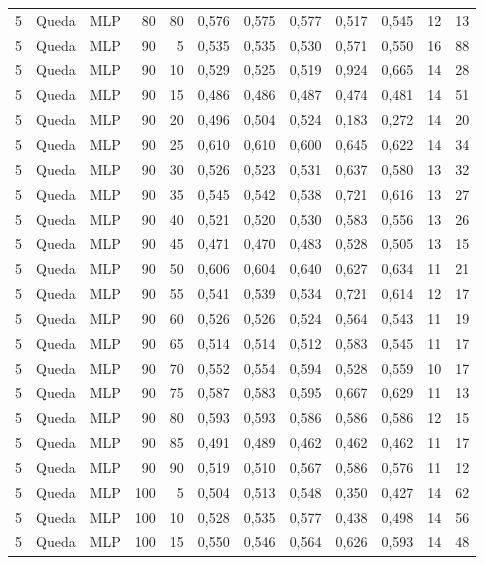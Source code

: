 \begin{longtable}{@{}rllrrrrrrrrr@{}}
5 & Queda & MLP & 80 & 80 & 0,576 & 0,575 & 0,577 & 0,517 & 0,545 & 12 & 13 \\
5 & Queda & MLP & 90 & 5 & 0,535 & 0,535 & 0,530 & 0,571 & 0,550 & 16 & 88 \\
5 & Queda & MLP & 90 & 10 & 0,529 & 0,525 & 0,519 & 0,924 & 0,665 & 14 & 28 \\
5 & Queda & MLP & 90 & 15 & 0,486 & 0,486 & 0,487 & 0,474 & 0,481 & 14 & 51 \\
5 & Queda & MLP & 90 & 20 & 0,496 & 0,504 & 0,524 & 0,183 & 0,272 & 14 & 20 \\
5 & Queda & MLP & 90 & 25 & 0,610 & 0,610 & 0,600 & 0,645 & 0,622 & 14 & 34 \\
5 & Queda & MLP & 90 & 30 & 0,526 & 0,523 & 0,531 & 0,637 & 0,580 & 13 & 32 \\
5 & Queda & MLP & 90 & 35 & 0,545 & 0,542 & 0,538 & 0,721 & 0,616 & 13 & 27 \\
5 & Queda & MLP & 90 & 40 & 0,521 & 0,520 & 0,530 & 0,583 & 0,556 & 13 & 26 \\
5 & Queda & MLP & 90 & 45 & 0,471 & 0,470 & 0,483 & 0,528 & 0,505 & 13 & 15 \\
5 & Queda & MLP & 90 & 50 & 0,606 & 0,604 & 0,640 & 0,627 & 0,634 & 11 & 21 \\
5 & Queda & MLP & 90 & 55 & 0,541 & 0,539 & 0,534 & 0,721 & 0,614 & 12 & 17 \\
5 & Queda & MLP & 90 & 60 & 0,526 & 0,526 & 0,524 & 0,564 & 0,543 & 11 & 19 \\
5 & Queda & MLP & 90 & 65 & 0,514 & 0,514 & 0,512 & 0,583 & 0,545 & 11 & 17 \\
5 & Queda & MLP & 90 & 70 & 0,552 & 0,554 & 0,594 & 0,528 & 0,559 & 10 & 17 \\
5 & Queda & MLP & 90 & 75 & 0,587 & 0,583 & 0,595 & 0,667 & 0,629 & 11 & 13 \\
5 & Queda & MLP & 90 & 80 & 0,593 & 0,593 & 0,586 & 0,586 & 0,586 & 12 & 15 \\
5 & Queda & MLP & 90 & 85 & 0,491 & 0,489 & 0,462 & 0,462 & 0,462 & 11 & 17 \\
5 & Queda & MLP & 90 & 90 & 0,519 & 0,510 & 0,567 & 0,586 & 0,576 & 11 & 12 \\
5 & Queda & MLP & 100 & 5 & 0,504 & 0,513 & 0,548 & 0,350 & 0,427 & 14 & 62 \\
5 & Queda & MLP & 100 & 10 & 0,528 & 0,535 & 0,577 & 0,438 & 0,498 & 14 & 56 \\
5 & Queda & MLP & 100 & 15 & 0,550 & 0,546 & 0,564 & 0,626 & 0,593 & 14 & 48 \\

\end{longtable}
